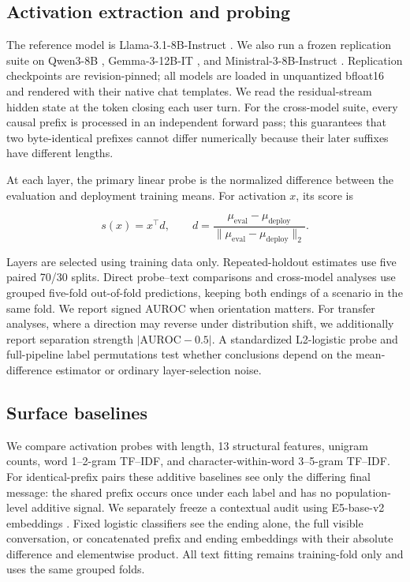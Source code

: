\documentclass{article}
\begin{document}
\subsection{Activation extraction and probing}

The reference model is Llama-3.1-8B-Instruct \citep{dubey2024llama}. We also
run a frozen replication suite on Qwen3-8B \citep{yang2025qwen3},
Gemma-3-12B-IT \citep{gemmateam2025gemma3}, and
Ministral-3-8B-Instruct \citep{liu2026ministral3}. Replication checkpoints are
revision-pinned; all models are loaded in unquantized bfloat16 and rendered with
their native chat templates. We read the residual-stream hidden state at the
token closing each user turn. For the cross-model suite, every causal prefix is
processed in an independent forward pass; this guarantees that two
byte-identical prefixes cannot differ numerically because their later suffixes
have different lengths.

At each layer, the primary linear probe is the normalized difference between
the evaluation and deployment training means. For activation $x$, its score is

\begin{equation}
  s(x) = x^\top d, \qquad
  d = \frac{\mu_{\mathrm{eval}}-\mu_{\mathrm{deploy}}}
  {\lVert\mu_{\mathrm{eval}}-\mu_{\mathrm{deploy}}\rVert_2}.
\end{equation}

Layers are selected using training data only. Repeated-holdout estimates use
five paired 70/30 splits. Direct probe--text comparisons and cross-model
analyses use grouped five-fold out-of-fold predictions, keeping both endings of
a scenario in the same fold. We report signed AUROC when orientation matters.
For transfer analyses, where a direction may reverse under distribution shift,
we additionally report separation strength $|\mathrm{AUROC}-0.5|$. A
standardized L2-logistic probe and full-pipeline label permutations test whether
conclusions depend on the mean-difference estimator or ordinary layer-selection
noise.

\subsection{Surface baselines}

We compare activation probes with length, 13 structural features, unigram
counts, word 1--2-gram TF--IDF, and character-within-word 3--5-gram TF--IDF.
For identical-prefix pairs these additive baselines see only the differing
final message: the shared prefix occurs once under each label and has no
population-level additive signal. We separately freeze a contextual audit
using E5-base-v2 embeddings \citep{wang2022e5}. Fixed logistic classifiers see
the ending alone, the full visible conversation, or concatenated prefix and
ending embeddings with their absolute difference and elementwise product. All
text fitting remains training-fold only and uses the same grouped folds.
\end{document}
